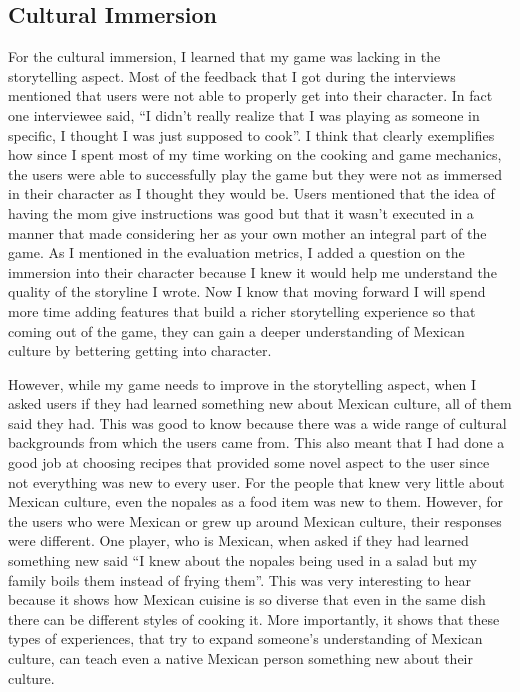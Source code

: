 \documentclass[10pt,twocolumn]{article}
\begin{document}
\subsection{Cultural Immersion}
For the cultural immersion, I learned that my game was lacking in the storytelling aspect. Most of the feedback that I got during the interviews mentioned that users were not able to properly get into their character. In fact one interviewee said, “I didn’t really realize that I was playing as someone in specific, I thought I was just supposed to cook”. I think that clearly exemplifies how since I spent most of my time working on the cooking and game mechanics, the users were able to successfully play the game but they were not as immersed in their character as I thought they would be. Users mentioned that the idea of having the mom give instructions was good but that it wasn’t executed in a manner that made considering her as your own mother an integral part of the game. As I mentioned in the evaluation metrics, I added a question on the immersion into their character because I knew it would help me understand the quality of the storyline I wrote. Now I know that moving forward I will spend more time adding features that build a richer storytelling experience so that coming out of the game, they can gain a deeper understanding of Mexican culture by bettering getting into character. \par
However, while my game needs to improve in the storytelling aspect, when I asked users if they had learned something new about Mexican culture, all of them said they had. This was good to know because there was a wide range of cultural backgrounds from which the users came from. This also meant that I had done a good job at choosing recipes that provided some novel aspect to the user since not everything was new to every user. For the people that knew very little about Mexican culture, even the nopales as a food item was new to them. However, for the users who were Mexican or grew up around Mexican culture, their responses were different. One player, who is Mexican, when asked if they had learned something new said “I knew about the nopales being used in a salad but my family boils them instead of frying them”. This was very interesting to hear because it shows how Mexican cuisine is so diverse that even in the same dish there can be different styles of cooking it. More importantly, it shows that these types of experiences, that try to expand someone’s understanding of Mexican culture, can teach even a native Mexican person something new about their culture. \par
\end{document}
